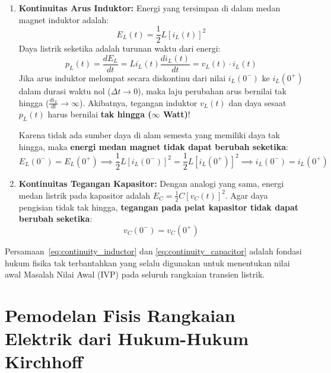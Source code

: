 \documentclass[11pt,a4paper]{article}
\theoremstyle{definition}
\begin{document}
\begin{enumerate}
    \item \textbf{Kontinuitas Arus Induktor:}
    Energi yang tersimpan di dalam medan magnet induktor adalah:
    \begin{equation}
        E_L(t) = \frac{1}{2} L [i_L(t)]^2
    \end{equation}
    Daya listrik seketika adalah turunan waktu dari energi:
    \begin{equation}
        p_L(t) = \frac{dE_L}{dt} = L i_L(t) \frac{di_L(t)}{dt} = v_L(t) \cdot i_L(t)
    \end{equation}
    Jika arus induktor melompat secara diskontinu dari nilai $i_L(0^-)$ ke $i_L(0^+)$ dalam durasi waktu nol ($\Delta t \to 0$), maka laju perubahan arus bernilai tak hingga ($\frac{di_L}{dt} \to \infty$). Akibatnya, tegangan induktor $v_L(t)$ dan daya sesaat $p_L(t)$ harus bernilai \textbf{tak hingga ($\infty$ Watt)}!
    
    Karena tidak ada sumber daya di alam semesta yang memiliki daya tak hingga, maka \textbf{energi medan magnet tidak dapat berubah seketika}:
    \begin{equation}
        E_L(0^-) = E_L(0^+) \implies \frac{1}{2} L [i_L(0^-)]^2 = \frac{1}{2} L [i_L(0^+)]^2 \implies i_L(0^-) = i_L(0^+)
        \label{eq:continuity_inductor}
    \end{equation}
    
    \item \textbf{Kontinuitas Tegangan Kapasitor:}
    Dengan analogi yang sama, energi medan listrik pada kapasitor adalah $E_C = \frac{1}{2} C [v_C(t)]^2$. Agar daya pengisian tidak tak hingga, \textbf{tegangan pada pelat kapasitor tidak dapat berubah seketika}:
    \begin{equation}
        v_C(0^-) = v_C(0^+)
        \label{eq:continuity_capacitor}
    \end{equation}
\end{enumerate}

Persamaan~\eqref{eq:continuity_inductor} dan \eqref{eq:continuity_capacitor} adalah fondasi hukum fisika tak terbantahkan yang selalu digunakan untuk menentukan nilai awal Masalah Nilai Awal (IVP) pada seluruh rangkaian transien listrik.


\section{Pemodelan Fisis Rangkaian Elektrik dari Hukum-Hukum Kirchhoff}
\end{document}
